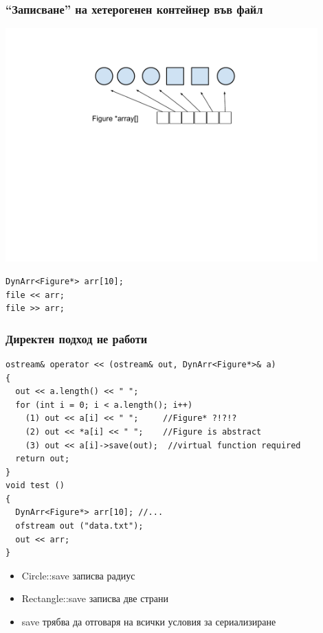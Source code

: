\documentclass{beamer}
\begin{document}
\begin{frame}[fragile]
\frametitle{``Записване'' на хетерогенен контейнер във файл}

\vspace{-60px}
\begin{center}
\includegraphics[width=12.0cm]{images/array}
\end{center}

\vspace{-160px}
\begin{lstlisting}
DynArr<Figure*> arr[10];
file << arr;
file >> arr;
\end{lstlisting}  

\end{frame}





\begin{frame}[fragile]
\frametitle{Директен подход не работи}

\begin{flushleft}
\begin{lstlisting}
ostream& operator << (ostream& out, DynArr<Figure*>& a)
{
  out << a.length() << " ";
  for (int i = 0; i < a.length(); i++)
    (1) out << a[i] << " ";     //Figure* ?!?!?
    (2) out << *a[i] << " ";    //Figure is abstract
    (3) out << a[i]->save(out);  //virtual function required
  return out;
}
void test ()
{
  DynArr<Figure*> arr[10]; //...
  ofstream out ("data.txt");
  out << arr;
}
\end{lstlisting}  
\end{flushleft}

\begin{itemize}
  \item Circle::save записва радиус
  \item Rectangle::save записва две страни
  \item save трябва да отговаря на всички условия за сериализиране
\end{itemize}

\end{frame}
\end{document}
